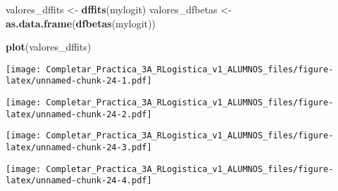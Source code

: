 \documentclass[
]{article}
\newenvironment{Shaded}{\begin{snugshade}}{\end{snugshade}}
\newcommand{\AttributeTok}[1]{\textcolor[rgb]{0.13,0.29,0.53}{#1}}
\newcommand{\FunctionTok}[1]{\textcolor[rgb]{0.13,0.29,0.53}{\textbf{#1}}}
\newcommand{\NormalTok}[1]{#1}
\newcommand{\OtherTok}[1]{\textcolor[rgb]{0.56,0.35,0.01}{#1}}
\newcommand{\SpecialCharTok}[1]{\textcolor[rgb]{0.81,0.36,0.00}{\textbf{#1}}}
\newcommand{\StringTok}[1]{\textcolor[rgb]{0.31,0.60,0.02}{#1}}
\begin{document}
\begin{Shaded}
\begin{Highlighting}[]
\NormalTok{valores\_dffits }\OtherTok{\textless{}{-}} \FunctionTok{dffits}\NormalTok{(mylogit)}
\NormalTok{valores\_dfbetas }\OtherTok{\textless{}{-}} \FunctionTok{as.data.frame}\NormalTok{(}\FunctionTok{dfbetas}\NormalTok{(mylogit))}

\FunctionTok{plot}\NormalTok{(valores\_dffits)}
\end{Highlighting}
\end{Shaded}

\texttt{[image: Completar\_Practica\_3A\_RLogistica\_v1\_ALUMNOS\_files/figure-latex/unnamed-chunk-24-1.pdf]}

\begin{Shaded}
\end{Shaded}

\texttt{[image: Completar\_Practica\_3A\_RLogistica\_v1\_ALUMNOS\_files/figure-latex/unnamed-chunk-24-2.pdf]}

\begin{Shaded}
\end{Shaded}

\texttt{[image: Completar\_Practica\_3A\_RLogistica\_v1\_ALUMNOS\_files/figure-latex/unnamed-chunk-24-3.pdf]}

\begin{Shaded}
\end{Shaded}

\texttt{[image: Completar\_Practica\_3A\_RLogistica\_v1\_ALUMNOS\_files/figure-latex/unnamed-chunk-24-4.pdf]}

\begin{Shaded}
\end{Shaded}
\end{document}
